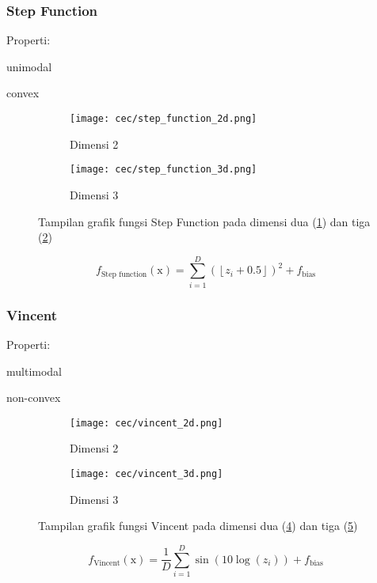 \subsubsection*{Step Function}
\noindent Properti:
\begin{packed_item}
  \item unimodal
  \item convex
\end{packed_item}
\begin{figure}[H]
	\centering
	\begin{subfigure}[b]{0.4\textwidth}
		\centering
		\texttt{[image: cec/step\_function\_2d.png]}
		\caption{Dimensi 2}
		\label{fig:step-2d}
	\end{subfigure}
	\hfill
	\begin{subfigure}[b]{0.4\textwidth}
		\centering
		\texttt{[image: cec/step\_function\_3d.png]}
		\caption{Dimensi 3}
		\label{fig:step-3d}
	\end{subfigure}
	\caption{Tampilan grafik fungsi Step Function pada dimensi dua (\cref{fig:step-2d}) dan tiga (\cref{fig:step-3d})}
	\label{fig:step-function}
\end{figure}
\begin{equation}
  f_{\text{Step function}}(\mathrm{x})=\sum_{i=1}^{D}\left(\left\lfloor z_i + 0.5 \right\rfloor \right)^2+f_{\text{bias}}
\end{equation}

\subsubsection*{Vincent}
\noindent Properti:
\begin{packed_item}
  \item multimodal
  \item non-convex
\end{packed_item}
\begin{figure}[H]
	\centering
	\begin{subfigure}[b]{0.4\textwidth}
		\centering
		\texttt{[image: cec/vincent\_2d.png]}
		\caption{Dimensi 2}
		\label{fig:vincent-2d}
	\end{subfigure}
	\hfill
	\begin{subfigure}[b]{0.4\textwidth}
		\centering
		\texttt{[image: cec/vincent\_3d.png]}
		\caption{Dimensi 3}
		\label{fig:vincent-3d}
	\end{subfigure}
	\caption{Tampilan grafik fungsi Vincent pada dimensi dua (\cref{fig:vincent-2d}) dan tiga (\cref{fig:vincent-3d})}
	\label{fig:vincent}
\end{figure}
\begin{equation}
  f_{\text{Vincent}}(\mathrm{x})=\frac{1}{D}\sum_{i=1}^{D}\sin\left(10 \log\left(z_i \right)  \right) +f_{\text{bias}}
\end{equation}


